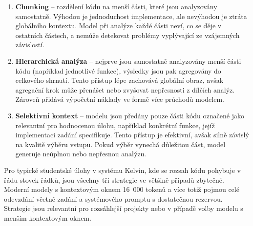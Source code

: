 \begin{enumerate}
    \item \textbf{Chunking} -- rozdělení kódu na menší části, které jsou analyzovány samostatně.
    Výhodou je jednoduchost implementace, ale nevýhodou je ztráta globálního kontextu.
    Model při analýze každé části neví, co se děje v ostatních částech, a nemůže detekovat problémy vyplývající ze vzájemných závislostí.

    \item \textbf{Hierarchická analýza} -- nejprve jsou samostatně analyzovány menší části kódu (například jednotlivé funkce), výsledky jsou pak agregovány do celkového shrnutí.
    Tento přístup lépe zachovává globální obraz, avšak agregační krok může přenášet nebo zvyšovat nepřesnosti z dílčích analýz.
    Zároveň přidává výpočetní náklady ve formě více průchodů modelem.

    \item \textbf{Selektivní kontext} -- modelu jsou předány pouze části kódu označené jako relevantní pro hodnocenou úlohu, například konkrétní funkce, jejíž implementaci zadání specifikuje.
    Tento přístup je efektivní, avšak silně závislý na kvalitě výběru vstupu.
    Pokud výběr vynechá důležitou část, model generuje neúplnou nebo nepřesnou analýzu.
\end{enumerate}

Pro typické studentské úlohy v systému Kelvin, kde se rozsah kódu pohybuje v řádu stovek řádků, jsou všechny tři strategie ve většině případů zbytečné.
Moderní modely s kontextovým oknem 16~000 tokenů a více totiž pojmou celé odevzdání včetně zadání a systémového promptu s dostatečnou rezervou.
Strategie jsou relevantní pro rozsáhlejší projekty nebo v případě volby modelu s menším kontextovým oknem.

\endinput